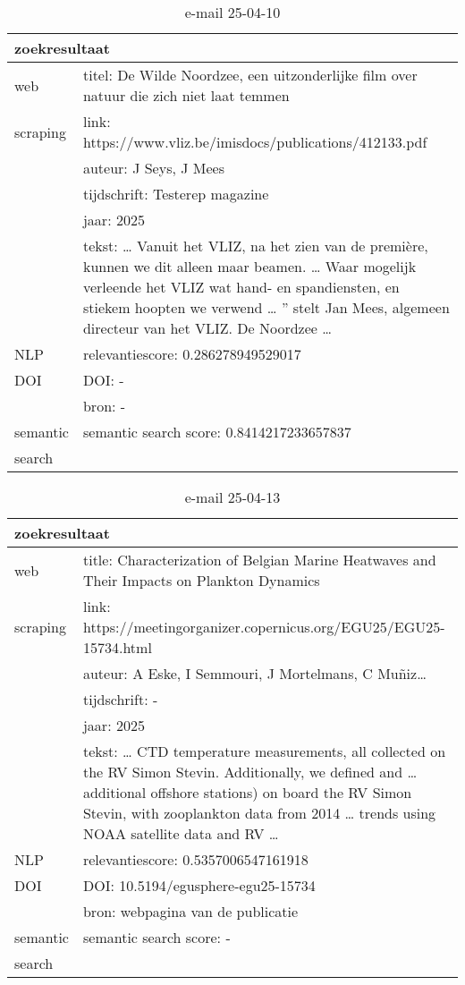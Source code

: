 \begin{table}[h!]
    \caption{e-mail 25-04-10}
    \centering
    \begin{tabularx}{\textwidth}{|p{4cm}|X|} 
        \hline
        \multicolumn{2}{|X|}{\textbf{zoekresultaat}} \\
        \hline
        web &titel: De Wilde Noordzee, een uitzonderlijke film over natuur die zich niet laat temmen\\
        scraping&link: https://www.vliz.be/imisdocs/publications/412133.pdf\\
        &auteur:  J Seys, J Mees\\
        &tijdschrift: Testerep magazine\\
        &jaar: 2025\\
        &tekst: … Vanuit het VLIZ, na het zien van de première, kunnen we dit alleen maar beamen. … Waar mogelijk verleende het VLIZ wat hand- en spandiensten, en stiekem hoopten we verwend … ” stelt Jan Mees, algemeen directeur van het VLIZ. De Noordzee …\\
        \hline
        NLP&relevantiescore: 0.286278949529017\\
        \hline
        DOI&DOI: -\\
        &bron: -\\
        \hline
        semantic&semantic search score: 0.8414217233657837\\
        search&\\
        \hline
    \end{tabularx}
    \label{table:email20250410}
\end{table}
\begin{table}[h!]
    \caption{e-mail 25-04-13}
    \centering
    \begin{tabularx}{\textwidth}{|p{4cm}|X|} 
        \hline
        \multicolumn{2}{|X|}{\textbf{zoekresultaat}} \\
        \hline
        web &title: Characterization of Belgian Marine Heatwaves and Their Impacts on Plankton Dynamics\\
        scraping&link: https://meetingorganizer.copernicus.org/EGU25/EGU25-15734.html\\
        &auteur: A Eske, I Semmouri, J Mortelmans, C Muñiz…\\
        &tijdschrift: -\\
        &jaar: 2025\\
        &tekst: … CTD temperature measurements, all collected on the RV Simon Stevin. Additionally, we defined and … additional offshore stations) on board the RV Simon Stevin, with zooplankton data from 2014 … trends using NOAA satellite data and RV …\\
        \hline
        NLP&relevantiescore: 0.5357006547161918\\
        \hline
        DOI&DOI: 10.5194/egusphere-egu25-15734\\
        &bron: webpagina van de publicatie\\
        \hline
        semantic&semantic search score: -\\
        search&\\
        \hline
    \end{tabularx}
    \label{table:email20250413}
\end{table}
